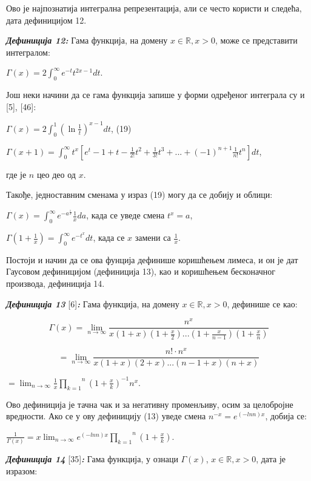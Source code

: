 Ово је најпознатија интегрална репрезентација, али се често користи и
следећа, дата дефиницијом 12.

\emph{\textbf{Дефиниција 12:}} Гама функција, на домену
\(x\mathbb{\in R,}x > 0\), може се представити интегралом:

\(\Gamma(x) = 2\int_{0}^{\infty}e^{- t}t^{2x - 1}dt\).

Још неки начини да се гама функција запише у форми одређеног интеграла
су и {[}5{]}, {[}46{]}:

\(\Gamma(x) = 2\int_{0}^{1}\left( \ln\frac{1}{t} \right)^{x - 1}dt\),
(19)

\(\Gamma(x + 1) = \int_{0}^{\infty}t^{x}\left\lbrack e^{t} - 1 + t - \frac{1}{2!}t^{2} + \frac{1}{3!}t^{3} + ... + {( - 1)}^{n + 1}\frac{1}{n!}t^{n} \right\rbrack dt\),

где је \(n\) цео део од \(x\).

Такође, једноставним сменама у израз (19) могу да се добију и облици:

\(\Gamma(x) = \int_{0}^{\infty}e^{- a^{\frac{1}{x}}}\frac{1}{x}da\),
када се уведе смена \(t^{x} = a\),

\(\Gamma\left( 1 + \frac{1}{x} \right) = \int_{0}^{\infty}e^{- t^{x}}dt\),
када се \(x\) замени са \(\frac{1}{x}\).

Постоји и начин да се ова фунција дефинише коришћењем лимеса, и он је
дат Гаусовом дефиницијом (дефиниција 13), као и коришћењем бесконачног
производа, дефиниција 14.

\emph{\textbf{Дефиниција 13}} {[}6{]}\emph{\textbf{:}} Гама функција, на
домену \(x\mathbb{\in R,}x > 0\), дефинише се као:

\[\Gamma(x) = \lim_{n \rightarrow \infty}\frac{n^{x}}{x(1 + x)(1 + \frac{x}{2})...(1 + \frac{x}{n - 1})(1 + \frac{x}{n})}\]

\[= \lim_{n \rightarrow \infty}\frac{n! \cdot n^{x}}{x(1 + x)(2 + x)...(n - 1 + x)(n + x)}\]

\(= \lim_{n \rightarrow \infty}\frac{1}{x}\overset{n}{\prod_{k = 1}}\left( 1 + \frac{x}{k} \right)^{- 1}n^{x}\).

Ово дефиниција је тачна чак и за негативну променљиву, осим за
целобројне вредности. Ако се у ову дефиницију (13) уведе смена
\(n^{- x} = e^{( - lnn)x}\), добија се:

\(\frac{1}{\Gamma(x)} = x\lim_{n \rightarrow \infty}e^{( - lnn)x}\overset{n}{\prod_{k = 1}}\left( 1 + \frac{x}{k} \right)\).

\emph{\textbf{Дефиниција 14}} {[}35{]}\emph{\textbf{:}} Гама функција, у
ознаци \(\Gamma(x)\), \(x\mathbb{\in R,}x > 0\), дата је изразом:

